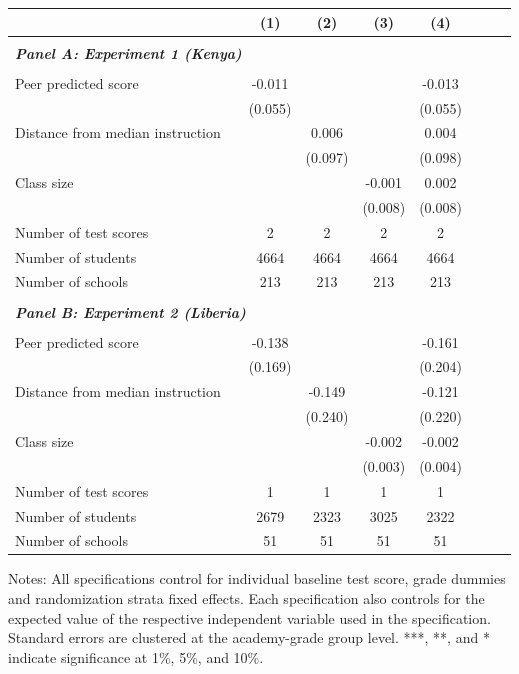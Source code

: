 \begin{center} 
\caption{\small Effect on test scores} 
\label{tab:descriptives} 
\begin{scriptsize}
\begin{threeparttable}
\begin{tabular} {@{} l l c c c c c c c  @{}} \toprule \toprule
& &(1)&(2)&(3)&(4) \\ \midrule 
\\
\multicolumn{3}{l}{\textbf{\textit{Panel A: Experiment 1 (Kenya)}}} \\
\\
Peer predicted score &  & -0.011 &  &  & -0.013 \\
                 &  & (0.055) &  &  & (0.055) \\
Distance from median instruction &  &  & 0.006 &  & 0.004 \\
                 &  &  & (0.097) &  & (0.098) \\
Class size &  &  &  & -0.001 & 0.002 \\
                 &  &  &  & (0.008) & (0.008) \\
\midrule
Number of test scores &  & 2 & 2 & 2 & 2 \\
Number of students &  & 4664 & 4664 & 4664 & 4664 \\
Number of schools &  & 213 & 213 & 213 & 213 \\
 \midrule
\\
\multicolumn{3}{l}{\textbf{\textit{Panel B: Experiment 2 (Liberia)}}} \\
\\
Peer predicted score &  & -0.138 &  &  & -0.161 \\
                 &  & (0.169) &  &  & (0.204) \\
Distance from median instruction &  &  & -0.149 &  & -0.121 \\
                 &  &  & (0.240) &  & (0.220) \\
Class size &  &  &  & -0.002 & -0.002 \\
                 &  &  &  & (0.003) & (0.004) \\
\midrule
Number of test scores &  & 1 & 1 & 1 & 1 \\
Number of students &  & 2679 & 2323 & 3025 & 2322 \\
Number of schools &  & 51 & 51 & 51 & 51 \\
\bottomrule
\end{tabular}
\begin{tablenotes}
\item Notes: All specifications control for individual baseline test score, grade dummies and randomization strata fixed effects. Each specification also controls for the expected value of the respective independent variable used in the specification. Standard errors are clustered at the academy-grade group level. ***, **, and * indicate significance at 1\%, 5\%, and 10\%.\end{tablenotes}
\end{threeparttable}
\end{scriptsize}
\end{center}
\clearpage
